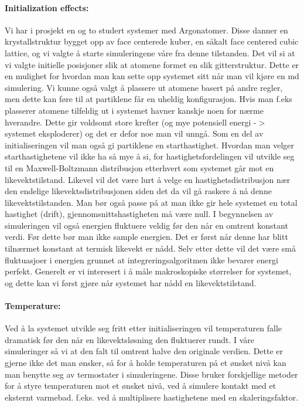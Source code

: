 \documentclass[a4paper,10pt]{article}
\begin{document}
\paragraph{Initialization effects:} Vi har i prosjekt en og to studert systemer med Argonatomer. Disse danner en krystallstruktur bygget opp av face centerede kuber, en såkalt face centered cubic lattice, og vi valgte å starte simuleringene våre fra denne tilstanden. Det vil si at vi valgte initielle posisjoner slik at atomene formet en slik gitterstruktur. Dette er en mulighet for hvordan man kan sette opp systemet sitt når man vil kjøre en md simulering. Vi kunne også valgt å plassere ut atomene basert på andre regler, men dette kan føre til at partiklene får en uheldig konfigurasjon. Hvis man f.eks plasserer atomene tilfeldig ut i systemet havner kanskje noen for nærme hverandre. Dette gir voldsomt store krefter (og mye potensiell energi -$>$ systemet eksploderer) og det er defor noe man vil unngå. Som en del av initialiseringen vil man også gi partiklene en starthastighet. Hvordan man velger starthastighetene vil ikke ha så mye å si, for hastighetsfordelingen vil utvikle seg til en Maxwell-Boltzmann distribusjon etterhvert som systemet går mot en likevektstilstand. Likevel vil det være lurt å velge en hastighetsdistribusjon nær den endelige likevektsdistribusjonen siden det da vil gå raskere å nå denne likevektstilstanden. Man bør også passe på at man ikke gir hele systemet en total hastighet (drift), gjennomsnittshastigheten må være null. I begynnelsen av simuleringen vil også energien fluktuere veldig før den når en omtrent konstant verdi. Før dette bør man ikke sample energien. Det er først når denne har blitt tilnærmet konstant at termisk likevekt er nådd. Selv etter dette vil det være små fluktuasjoer i energien grunnet at integreringsalgoritmen ikke bevarer energi perfekt. Generelt er vi interesert i å måle makroskopiske størrelser for systemet, og dette kan vi først gjøre når systemet har nådd en likevektstilstand. 

\paragraph{Temperature:} Ved å la systemet utvikle seg fritt etter initialiseringen vil temperaturen falle dramatisk før den når en likevektsløsning den fluktuerer rundt. I våre simuleringer så vi at den falt til omtrent halve den originale verdien. Dette er gjerne ikke det man ønsker, så for å holde temperaturen på et ønsket nivå kan man benytte seg av  termostater i simuleringene. Disse bruker forskjellige metoder for å styre temperaturen mot et ønsket nivå, ved å simulere kontakt med et eksternt varmebad. f.eks. ved å multiplisere hastighetene med en skaleringsfaktor. 
\end{document}
